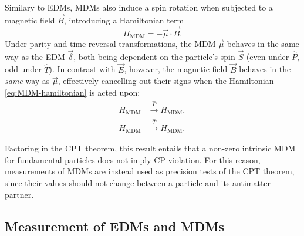 Similary to EDMs, MDMs also induce a spin rotation when subjected to a magnetic field $\vec{B}$, introducing a Hamiltonian term
\begin{equation}
H_\text{MDM} = - \vec{\mu} \cdot \vec{B} .
\label{eq:MDM-hamiltonian}
\end{equation}
Under parity and time reversal transformations, the MDM $\vec{\mu}$ behaves in the same way as the EDM $\vec{\delta}$, both being dependent on the particle's spin $\vec{S}$ (even under $\hat{P}$, odd under $\hat{T}$).
In contrast with $\vec{E}$, however, the magnetic field $\vec{B}$ behaves in the \textit{same} way as $\vec{\mu}$, effectively cancelling out their signs when the Hamiltonian \eqref{eq:MDM-hamiltonian} is acted upon:
\begin{align}
H_\text{MDM} &\xrightarrow{\hat{P}} H_\text{MDM},
\label{eq:MDM-hamiltonian-under-P} \\
H_\text{MDM} &\xrightarrow{\hat{T}} H_\text{MDM}.
\label{eq:MDM-hamiltonian-under-T}
\end{align}

Factoring in the CPT theorem, this result entails that a non-zero intrinsic MDM for fundamental particles does not imply CP violation.
For this reason, measurements of MDMs are instead used as precision tests of the CPT theorem, since their values should not change between a particle and its antimatter partner.

\subsection{Measurement of EDMs and MDMs}
\label{sec:emdm-measurement}


